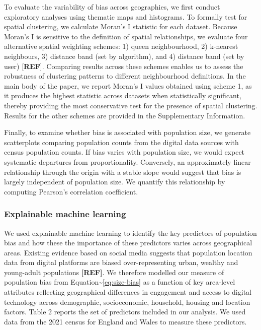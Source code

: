 \documentclass[]{rsos}%
\begin{document}
To evaluate the variability of bias across geographies, we first conduct
exploratory analyses using thematic maps and histograms. To formally
test for spatial clustering, we calculate Moran's I statistic for each
dataset. Because Moran's I is sensitive to the definition of spatial
relationships, we evaluate four alternative spatial weighting schemes:
1) queen neighbourhood, 2) k-nearest neighbours, 3) distance band (set
by algorithm), and 4) distance band (set by user) {[}\textbf{REF}{]}. Comparing
results across these schemes enables us to assess the robustness of
clustering patterns to different neighbourhood definitions. In the main
body of the paper, we report Moran's I values obtained using scheme 1,
as it produces the highest statistic across datasets when statistically
significant, thereby providing the most conservative test for the
presence of spatial clustering. Results for the other schemes are
provided in the Supplementary Information.

Finally, to examine whether bias is associated with population size, we
generate scatterplots comparing population counts from the digital data
sources with census population counts. If bias varies with population
size, we would expect systematic departures from proportionality.
Conversely, an approximately linear relationship through the origin with
a stable slope would suggest that bias is largely independent of
population size. We quantify this relationship by computing Pearson's
correlation coefficient.

\subsubsection{Explainable machine learning}\label{sec-eml}

We used explainable machine learning to identify the key predictors of
population bias and how these the importance of these predictors varies
across geographical areas. Existing evidence based on social media
suggests that population location data from digital platforms are biased
over-representing urban, wealthy and young-adult populations \textbf{{[}REF{]}}.
We therefore modelled our measure of population bias from
Equation\textasciitilde{}\ref{eq:size-bias} as a function of key area-level attributes
reflecting geographical differences in engagement and access to digital
technology across demographic, socioeconomic, household, housing and
location factors. Table 2 reports the set of predictors included in our
analysis. We used data from the 2021 census for England and Wales to
measure these predictors.
\end{document}
